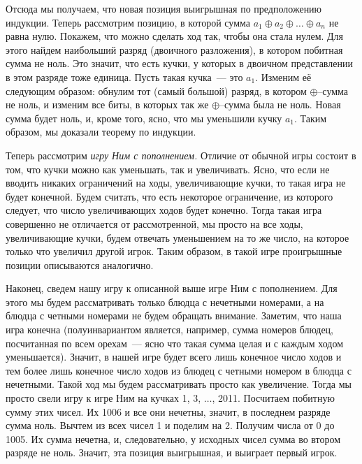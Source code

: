 Отсюда мы получаем, что новая позиция выигрышная по предположению индукции.
Теперь рассмотрим позицию, в которой сумма
$a_1 \oplus a_2 \oplus \ldots \oplus a_n$ не равна нулю.
Покажем, что можно сделать ход так, чтобы она стала нулем.
Для этого найдем наибольший разряд (двоичного разложения), в котором побитная
сумма не ноль.
Это значит, что есть кучки, у которых в двоичном представлении в этом разряде
тоже единица.
Пусть такая кучка~--- это $a_1$.
Изменим её следующим образом: обнулим тот (самый большой) разряд, в котором
$\oplus$--сумма не ноль, и изменим все биты, в которых так же $\oplus$--сумма
была не ноль.
Новая сумма будет ноль, и, кроме того, ясно, что мы уменьшили кучку $a_1$.
Таким образом, мы доказали теорему по индукции.
\par
Теперь рассмотрим \emph{игру Ним с пополнением.}
Отличие от обычной игры состоит в том, что кучки можно как уменьшать, так и
увеличивать.
Ясно, что если не вводить никаких ограничений на ходы, увеличивающие кучки, то
такая игра не будет конечной.
Будем считать, что есть некоторое ограничение, из которого следует, что число
увеличивающих ходов будет конечно.
Тогда такая игра совершенно не отличается от рассмотренной, мы просто на все
ходы, увеличивающие кучки, будем отвечать уменьшением на то же число, на
которое только что увеличил другой игрок.
Таким образом, в такой игре проигрышные позиции описываются аналогично.
\par
Наконец, сведем нашу игру к описанной выше игре Ним с пополнением.
Для этого мы будем рассматривать только блюдца с нечетными номерами, а на
блюдца с четными номерами не будем обращать внимание.
Заметим, что наша игра конечна
(полуинвариантом является, например, сумма номеров блюдец, посчитанная по всем
орехам~--- ясно что такая сумма целая и с каждым ходом уменьшается).
Значит, в нашей игре будет всего лишь конечное число ходов и тем более лишь
конечное число ходов из блюдец с четными номером в блюдца с нечетными.
Такой ход мы будем рассматривать просто как увеличение.
Тогда мы просто свели игру к игре Ним на кучках 1, 3, $\ldots$, 2011.
Посчитаем побитную сумму этих чисел.
Их 1006 и все они нечетны, значит, в последнем разряде сумма ноль.
Вычтем из всех чисел 1 и поделим на 2.
Получим числа от 0 до 1005.
Их сумма нечетна, и, следовательно, у исходных чисел сумма во втором разряде
не ноль.
Значит, эта позиция выигрышная, и выиграет первый игрок.
\endproblem
